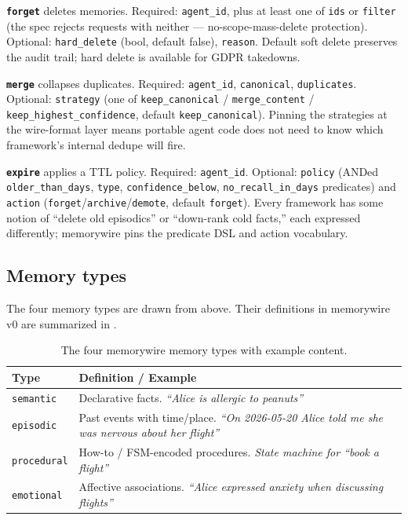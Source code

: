 \documentclass[11pt,letterpaper,twocolumn]{article}
\begin{document}
\textbf{\texttt{forget}} deletes memories. Required: \texttt{agent\_id}, plus at least one of \texttt{ids} or \texttt{filter} (the spec rejects requests with neither --- no-scope-mass-delete protection). Optional: \texttt{hard\_delete} (bool, default false), \texttt{reason}. Default soft delete preserves the audit trail; hard delete is available for GDPR takedowns.

\textbf{\texttt{merge}} collapses duplicates. Required: \texttt{agent\_id}, \texttt{canonical}, \texttt{duplicates}. Optional: \texttt{strategy} (one of \texttt{keep\_canonical} / \texttt{merge\_content} / \texttt{keep\_highest\_confidence}, default \texttt{keep\_canonical}). Pinning the strategies at the wire-format layer means portable agent code does not need to know which framework's internal dedupe will fire.

\textbf{\texttt{expire}} applies a TTL policy. Required: \texttt{agent\_id}. Optional: \texttt{policy} (ANDed \texttt{older\_than\_days}, \texttt{type}, \texttt{confidence\_below}, \texttt{no\_recall\_in\_days} predicates) and \texttt{action} (\texttt{forget}/\texttt{archive}/\texttt{demote}, default \texttt{forget}). Every framework has some notion of ``delete old episodics'' or ``down-rank cold facts,'' each expressed differently; memorywire pins the predicate DSL and action vocabulary.

\subsection{Memory types}
\label{sec:spec-types}

The four memory types are drawn from  above. Their definitions in memorywire v0 are summarized in .

\begin{table}[t]
\centering
\caption{The four memorywire memory types with example content.}
\label{tab:types}
\small
\begin{tabularx}{\columnwidth}{lX}
\toprule
\textbf{Type} & \textbf{Definition / Example} \\
\midrule
\texttt{semantic}   & Declarative facts. \emph{``Alice is allergic to peanuts''} \\
\texttt{episodic}   & Past events with time/place. \emph{``On 2026-05-20 Alice told me she was nervous about her flight''} \\
\texttt{procedural} & How-to / FSM-encoded procedures. \emph{State machine for ``book a flight''} \\
\texttt{emotional}  & Affective associations. \emph{``Alice expressed anxiety when discussing flights''} \\
\bottomrule
\end{tabularx}
\end{table}
\end{document}
